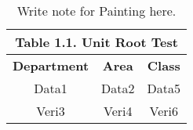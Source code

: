 \documentclass[10pt,a4paper]{article}
\begin{document}
\begin{table}[h]
	
	
	\centering
	
	\begin{tabular}{|c|c|c|}
		
		\multicolumn{3}{c}{\textbf{Table 1.1. Unit Root Test}} \\[1ex]
		
		
		\hline
		\textbf{Department} & \textbf{Area} & \textbf{Class} \\ \cline{1-3}
		\hline
		Data1 & Data2 & Data5 \\
		\hline
		Veri3 & Veri4 & Veri6 \\ \hline
		
	\end{tabular}
	\caption{Write note for Painting here.}
	\label{Table1}
	
\end{table}

\lipsum[2-3]
\end{document}

